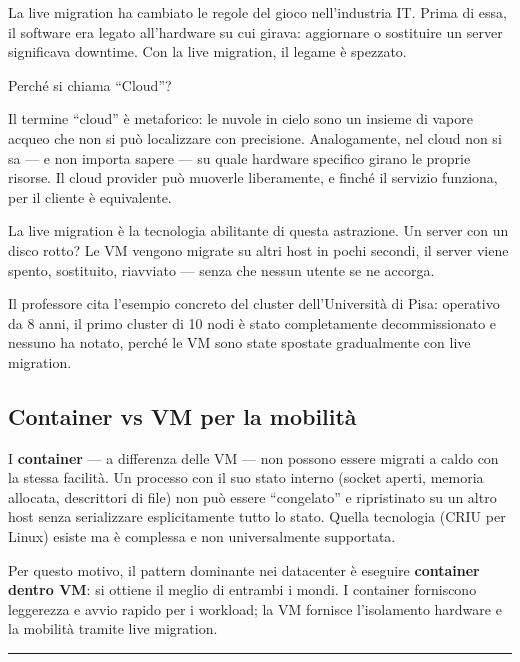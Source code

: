 \documentclass[
  italian,
  openany]{book}
\begin{document}
La live migration ha cambiato le regole del gioco nell'industria IT.
Prima di essa, il software era legato all'hardware su cui girava:
aggiornare o sostituire un server significava downtime. Con la live
migration, il legame è spezzato.

\begin{callouttip}{Perché si chiama “Cloud”?}

Il termine ``cloud'' è metaforico: le nuvole in cielo sono un insieme di
vapore acqueo che non si può localizzare con precisione. Analogamente,
nel cloud non si sa --- e non importa sapere --- su quale hardware
specifico girano le proprie risorse. Il cloud provider può muoverle
liberamente, e finché il servizio funziona, per il cliente è
equivalente.

\end{callouttip}

La live migration è la tecnologia abilitante di questa astrazione. Un
server con un disco rotto? Le VM vengono migrate su altri host in pochi
secondi, il server viene spento, sostituito, riavviato --- senza che
nessun utente se ne accorga.

Il professore cita l'esempio concreto del cluster dell'Università di
Pisa: operativo da 8 anni, il primo cluster di 10 nodi è stato
completamente decommissionato e nessuno ha notato, perché le VM sono
state spostate gradualmente con live migration.

\subsection{Container vs VM per la
mobilità}\label{container-vs-vm-per-la-mobilituxe0}

I \textbf{container} --- a differenza delle VM --- non possono essere
migrati a caldo con la stessa facilità. Un processo con il suo stato
interno (socket aperti, memoria allocata, descrittori di file) non può
essere ``congelato'' e ripristinato su un altro host senza serializzare
esplicitamente tutto lo stato. Quella tecnologia (CRIU per Linux) esiste
ma è complessa e non universalmente supportata.

Per questo motivo, il pattern dominante nei datacenter è eseguire
\textbf{container dentro VM}: si ottiene il meglio di entrambi i mondi.
I container forniscono leggerezza e avvio rapido per i workload; la VM
fornisce l'isolamento hardware e la mobilità tramite live migration.

\begin{center}\rule{0.5\linewidth}{0.5pt}\end{center}
\end{document}
